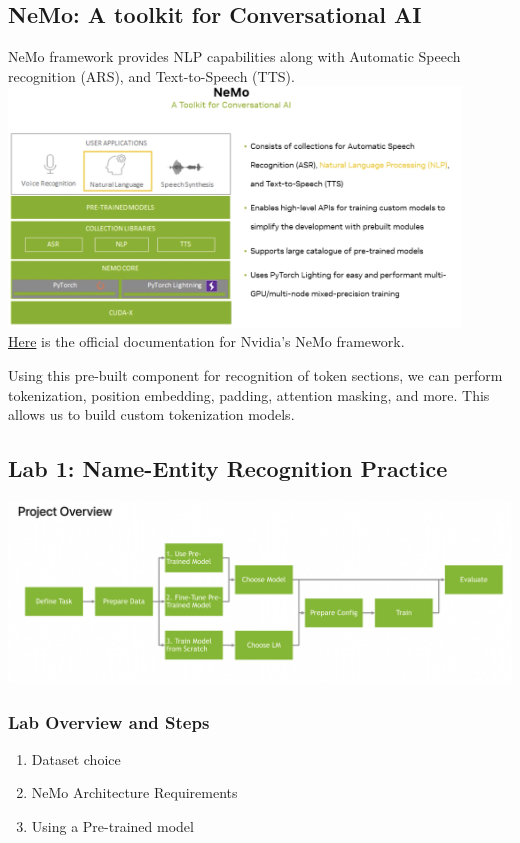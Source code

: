 \documentclass{article}
\begin{document}
\subsection{NeMo: A toolkit for Conversational AI}
NeMo framework provides NLP capabilities along with Automatic Speech recognition (ARS), and Text-to-Speech (TTS).\\\includegraphics[width=0.9\textwidth]{../images/nemoStructure.png} \\\href{https://docs.nvidia.com/nemo-framework/user-guide/latest/overview.html}{Here} is the official documentation for Nvidia's NeMo framework. 

Using this pre-built component for recognition of token sections, we can perform tokenization, position embedding, padding, attention masking, and more. This allows us to build custom tokenization models.

\subsection{Lab 1: Name-Entity Recognition Practice}
\includegraphics[width=\textwidth]{../images/lab1NER_overview.png}\\
\subsubsection{Lab Overview and Steps}
\begin{enumerate}
    \item Dataset choice
    \item NeMo Architecture Requirements
    \item Using a Pre-trained model
\end{enumerate}
\end{document}
